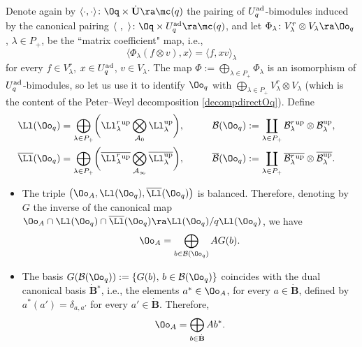 Denote again by $\langle\cdot,\cdot \rangle \colon \Oq \times \dot{\mathbf{U}} \ra \mc(q)$ the pairing of $U_q^{\rm ad}$-bimodules induced by the canonical pairing $\langle\ ,\ \rangle \colon \Oq \times U_q^{\rm ad} \ra \mc(q)$, and let $\Phi_\lambda\colon V_\lambda^r \otimes V_\lambda \ra \Oo_q$, $\lambda\in P_+$, be the ``matrix coefficient" map, i.e.,
\begin{equation}\label{pairingOAKashi}
\langle \Phi_\lambda (f \otimes v),x\rangle = \langle f, xv\rangle_\lambda
\end{equation}
for every $f\in V_\lambda^r$, $x\in U_q^{\rm ad}$, $v\in V_\lambda$. The map $\Phi := \bigoplus_{\lambda\in P_+} \Phi_\lambda$ is an isomorphism of $U_q^{\rm ad}$-bimodules, so let us use it to identify $\Oo_q$ with $\bigoplus_{\lambda\in P_+} V_\lambda^r \otimes V_\lambda$ (which is the content of the Peter--Weyl decomposition \eqref{decompdirectOq}). Define
\begin{alignat*}{3}
& \Ll(\Oo_q) = \bigoplus_{\lambda\in P_+} \biggl(\Ll_{\lambda}^r {}^{\rm up} \bigotimes_{\mathcal{A}_0} \Ll_{\lambda}^{\rm up}\biggr),\qquad && \mathcal{B}(\Oo_q) := \coprod_{\lambda\in P_+} \mathcal{B}_\lambda^r {}^{\rm up} \otimes \mathcal{B}_\lambda^{\rm up},& \\
& \overline{\Ll}(\Oo_q) = \bigoplus_{\lambda\in P_+} \biggl(\overline{\Ll_{\lambda}^r {}^{\rm up}} \bigotimes_{\mathcal{A}_\infty} \overline{\Ll_{\lambda}^{\rm up}}\biggr),\qquad && \overline{\mathcal{B}}(\Oo_q) := \coprod_{\lambda\in P_+} \overline{\mathcal{B}_\lambda^r {}^{\rm up}} \otimes \overline{\mathcal{B}_\lambda^{\rm up}}.&
\end{alignat*}
\begin{teo}\label{canKashi} \quad
\begin{itemize}\itemsep=0pt
\item[$(i)$] The triple $\big(\Oo_A,\Ll(\Oo_q),\overline{\Ll}(\Oo_q)\big)$ is balanced. Therefore, denoting by $G$ the inverse of the canonical map $\Oo_A \cap \Ll(\Oo_q) \cap \overline{\Ll}(\Oo_q)\ra \Ll(\Oo_q)/q\Ll(\Oo_q)$, we have
\[\Oo_A = \bigoplus_{b\in \mathcal{B}(\Oo_q)} A G(b).\]
\item[$(ii)$] The basis $G(\mathcal{B}(\Oo_q)):=\{G(b), \, b\in \mathcal{B}(\Oo_q)\}$ coincides with the dual canonical basis $\dot{\mathbf{B}} {}^*$, i.e., the elements $a^* \in \Oo_A$, for every $a\in \dot{\mathbf{B}}$, defined by $a^* (a') = \delta_{a,a'}$ for every $a'\in \dot{\mathbf{B}}$. Therefore, \[\Oo_A = \bigoplus_{b\in \dot{\mathbf{B}}} Ab^*.\]
\end{itemize}
\end{teo}
